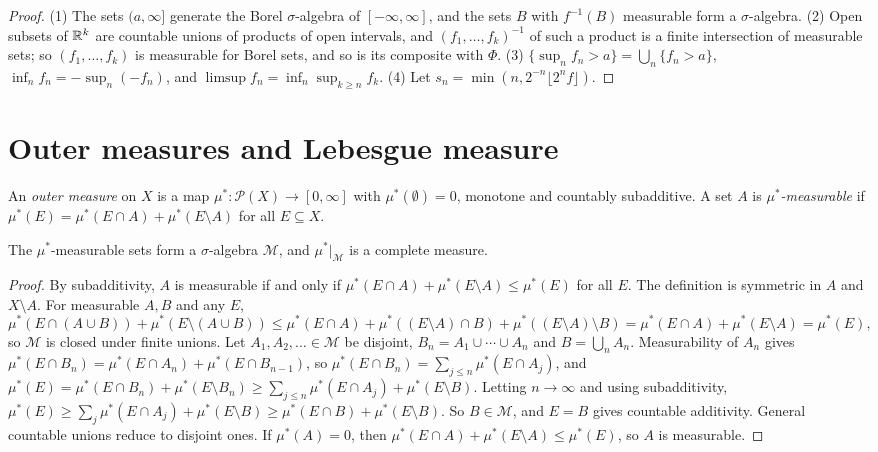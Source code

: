 \begin{proof}
(1) The sets $(a, \infty]$ generate the Borel $\sigma$-algebra of $[-\infty, \infty]$, and the sets $B$ with $f^{-1}(B)$ measurable form a $\sigma$-algebra. (2) Open subsets of $\mathbb{R}^k$ are countable unions of
products of open intervals, and $(f_1, \ldots, f_k)^{-1}$ of such a product is a finite intersection of measurable sets; so $(f_1, \ldots, f_k)$ is measurable for Borel sets, and so is its composite with $\Phi$.
(3) $\{\sup_nf_n > a\} = \bigcup_n\{f_n > a\}$, $\inf_nf_n = -\sup_n(-f_n)$, and $\limsup f_n = \inf_n\sup_{k \geq n}f_k$. (4) Let $s_n = \min(n, 2^{-n}\lfloor 2^nf \rfloor)$.
\end{proof}

\section{Outer measures and Lebesgue measure}\label{measure-theory:section-lebesgue}

\begin{definition}\label{measure-theory:definition-outer-measure}
An \emph{outer measure} on $X$ is a map $\mu^* \colon \mathcal{P}(X) \to [0, \infty]$ with $\mu^*(\emptyset) = 0$, monotone and countably subadditive. A set $A$ is \emph{$\mu^*$-measurable} if
$\mu^*(E) = \mu^*(E \cap A) + \mu^*(E \setminus A)$ for all $E \subseteq X$.
\end{definition}

\begin{theorem}\label{measure-theory:theorem-caratheodory}
The $\mu^*$-measurable sets form a $\sigma$-algebra $\mathcal{M}$, and $\mu^*|_\mathcal{M}$ is a complete measure.
\end{theorem}

\begin{proof}
By subadditivity, $A$ is measurable if and only if $\mu^*(E \cap A) + \mu^*(E \setminus A) \leq \mu^*(E)$ for all $E$. The definition is symmetric in $A$ and $X \setminus A$. For measurable $A, B$ and any $E$,
\[
\mu^*(E \cap (A \cup B)) + \mu^*(E \setminus (A \cup B)) \leq \mu^*(E \cap A) + \mu^*((E \setminus A) \cap B) + \mu^*((E \setminus A) \setminus B) = \mu^*(E \cap A) + \mu^*(E \setminus A) = \mu^*(E),
\]
so $\mathcal{M}$ is closed under finite unions. Let $A_1, A_2, \ldots \in \mathcal{M}$ be disjoint, $B_n = A_1 \cup \cdots \cup A_n$ and $B = \bigcup_nA_n$. Measurability of $A_n$ gives
$\mu^*(E \cap B_n) = \mu^*(E \cap A_n) + \mu^*(E \cap B_{n-1})$, so $\mu^*(E \cap B_n) = \sum_{j \leq n}\mu^*(E \cap A_j)$, and
$\mu^*(E) = \mu^*(E \cap B_n) + \mu^*(E \setminus B_n) \geq \sum_{j \leq n}\mu^*(E \cap A_j) + \mu^*(E \setminus B)$. Letting $n \to \infty$ and using subadditivity,
$\mu^*(E) \geq \sum_j\mu^*(E \cap A_j) + \mu^*(E \setminus B) \geq \mu^*(E \cap B) + \mu^*(E \setminus B)$. So $B \in \mathcal{M}$, and $E = B$ gives countable additivity. General countable unions reduce
to disjoint ones. If $\mu^*(A) = 0$, then $\mu^*(E \cap A) + \mu^*(E \setminus A) \leq \mu^*(E)$, so $A$ is measurable.
\end{proof}

